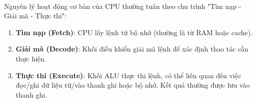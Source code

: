 \paragraph{}{Nguyên lý hoạt động cơ bản của CPU thường tuân theo chu trình "Tìm nạp - Giải mã - Thực thi":}

\begin{enumerate}
    \item \textbf{Tìm nạp (Fetch)}: CPU lấy lệnh từ bộ nhớ (thường là từ RAM hoặc cache).
    \item \textbf{Giải mã (Decode)}: Khối điều khiển giải mã lệnh để xác định thao tác cần thực hiện.
    \item \textbf{Thực thi (Execute)}: Khối ALU thực thi lệnh, có thể liên quan đến việc đọc/ghi dữ liệu từ/vào thanh ghi hoặc bộ nhớ. Kết quả thường được lưu vào thanh ghi.
\end{enumerate}

\pagebreak